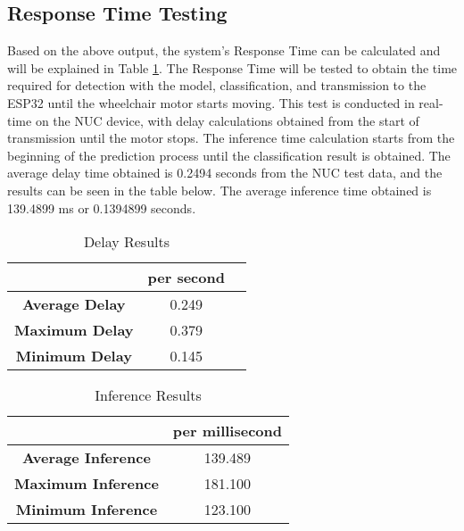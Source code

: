 \subsection{Response Time Testing}
Based on the above output, the system's Response Time can be calculated and will be explained in Table \ref{tb:Hasil Pengujian Response Time}. The Response Time will be tested to obtain the time required for detection with the model, classification, and transmission to the ESP32 until the wheelchair motor starts moving. This test is conducted in real-time on the NUC device, with delay calculations obtained from the start of transmission until the motor stops. The inference time calculation starts from the beginning of the prediction process until the classification result is obtained. The average delay time obtained is 0.2494 seconds from the NUC test data, and the results can be seen in the table below. The average inference time obtained is 139.4899 ms or 0.1394899 seconds.
\begin{table}[H]
    \centering
    \caption{Delay Results}
    \label{tb:Hasil Pengujian Response Time}
    \begin{tabular}{|c|c|c|}
        \hline 
        \cellcolor[HTML]{000000}                        & \cellcolor[HTML]{C0C0C0} \textbf{per second}  \\ \hline
        \cellcolor[HTML]{C0C0C0} \textbf{Average Delay} & 0.249                                                                        \\ \hline
        \cellcolor[HTML]{C0C0C0} \textbf{Maximum Delay}  & 0.379                                                                      \\ \hline
        \cellcolor[HTML]{C0C0C0} \textbf{Minimum Delay}   & 0.145                                                                      \\ \hline
    \end{tabular}
\end{table}

\begin{table}[H]
    \centering
    \caption{Inference Results}
    \label{tb:Hasil Inference}
    \begin{tabular}{|c|c|}
        \hline 
        \cellcolor[HTML]{000000}                        & \cellcolor[HTML]{C0C0C0} \textbf{per millisecond}   \\ \hline
        \cellcolor[HTML]{C0C0C0} \textbf{Average Inference} & 139.489                                                                       \\ \hline
        \cellcolor[HTML]{C0C0C0} \textbf{Maximum Inference}  & 181.100                                                                        \\ \hline
        \cellcolor[HTML]{C0C0C0} \textbf{Minimum Inference}   & 123.100                                                                       \\ \hline
    \end{tabular}
\end{table}


